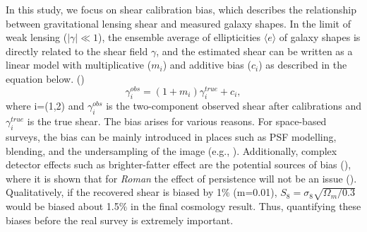 {In this study, we focus on shear calibration bias, which describes the relationship between gravitational lensing shear and measured galaxy shapes. In the limit of weak lensing ($\lvert\gamma\rvert\ll1$), the ensemble average of ellipticities $\langle e \rangle$ of galaxy shapes is directly related to the shear field $\gamma$, and the estimated shear can be written as a linear model with multiplicative ($m_{i}$) and additive bias ($c_{i}$) as described in the equation below. (\citealt{2006MNRAS.368.1323H, 2006MNRAS.366..101H, 2007MNRAS.376...13M}) 
\begin{equation}
    \gamma^{obs}_{i} = (1+m_{i})\gamma^{true}_{i} + c_{i}, 
    \label{eqn:linear}
\end{equation}
where i=(1,2) and $\gamma^{obs}_{i}$ is the two-component observed shear after calibrations and $\gamma^{true}_{i}$ is the true shear. The bias arises for various reasons. For space-based surveys, the bias can be mainly introduced in places such as PSF modelling, blending, and the undersampling of the image (e.g., \citealt{2018ARA&A..56..393M}). Additionally, complex detector effects such as brighter-fatter effect are the potential sources of bias (\citealt{2013MNRAS.429..661M}), where it is shown that for \emph{Roman} the effect of persistence will not be an issue (\citealt{2021arXiv210610273L}). Qualitatively, if the recovered shear is biased by 1$\%$ (m=0.01), $S_{8} = \sigma_{8} \sqrt{\Omega_{m}/0.3}$ would be biased about 1.5$\%$ in the final cosmology result. Thus, quantifying these biases before the real survey is extremely important. \par


}

